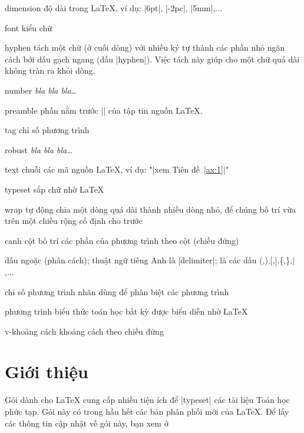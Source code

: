 \medskip
\begin{lentry}
\item[dimension] độ dài trong \LaTeX{}, ví dụ: |6pt|, |-2pc|, |5mm|,...
\item[font]kiểu chữ
\item[hyphen]tách một chữ (ở cuối dòng) với nhiều ký tự thành các phần nhỏ
	ngăn cách bởi dấu gạch ngang (dấu |hyphen|).
	Việc tách này giúp cho một chữ quá dài không tràn ra khỏi dòng.
\item[number] \emph{bla bla bla\ldots}
\item[preamble] phần nằm trước || của tập tin nguồn \LaTeX{}.
\item[tag] chỉ số phương trình
\item[robust]\emph{bla bla bla\ldots}
\item[text] chuỗi các mã nguồn \LaTeX{}, ví dụ: "|xem Tiên đề~\ref{ax:1}|"
\item[typeset] sắp chữ nhờ \LaTeX{}
\item[wrap] tự động chia một dòng quá dài thành nhiều dòng nhỏ, để chúng
	bố trí vừa trên một chiều rộng cố định cho trước
\item[canh cột]bố trí các phần của phương trình theo cột (chiều đứng)
\item[dấu ngoặc](phân cách); thuật ngữ tiếng Anh là |delimiter|; là các dấu
	(,),[,],\{,\},$\vert$,...
\item[chỉ số phương trình]nhãn dùng để phân biệt các phương trình
\item[phương trình] biểu thức toán học bất kỳ được biểu diễn nhờ \LaTeX{}
\item[v-khoảng cách] khoảng cách theo chiều đứng
\end{lentry}

\chapter{Giới thiệu}

Gói  dành cho \LaTeX{} cung cấp nhiều tiện ích để |typeset|
các tài liệu Toán học phức tạp. Gói này có trong hầu hết các bản phân phối
mới của \LaTeX{}. Để lấy các thông tin cập nhật về gói này, bạn xem ở

